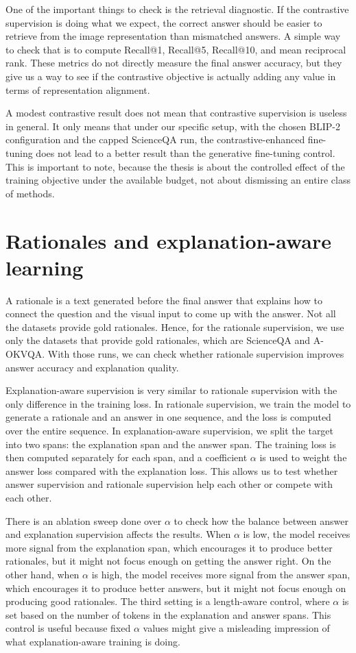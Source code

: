 \documentclass[12pt,bibliography=totoc,listof=totoc,BCOR=5mm,DIV=12,oneside,open=any]{scrbook}
\begin{document}
One of the important things to check is the retrieval diagnostic.
If the contrastive supervision is doing what we expect, the correct answer should be easier to retrieve from the image representation than mismatched answers.
A simple way to check that is to compute Recall@1, Recall@5, Recall@10, and mean reciprocal rank.
These metrics do not directly measure the final answer accuracy, but they give us a way to see if the contrastive objective is actually adding any value in terms of representation alignment.

A modest contrastive result does not mean that contrastive supervision is useless in general.
It only means that under our specific setup, with the chosen BLIP-2 configuration and the capped ScienceQA run, the contrastive-enhanced fine-tuning
does not lead to a better result than the generative fine-tuning control.
This is important to note, because the thesis is about the controlled effect of the training objective under the available budget, not about dismissing an entire class of methods.


\section{Rationales and explanation-aware learning}
A rationale is a text generated before the final answer that explains how to connect the question and the visual input to come up with the answer.
Not all the datasets provide gold rationales.
Hence, for the rationale supervision, we use only the datasets that provide gold rationales, which are ScienceQA and A-OKVQA.
With those runs, we can check whether rationale supervision improves answer accuracy and explanation quality.

Explanation-aware supervision is very similar to rationale supervision with the only difference in the training loss.
In rationale supervision, we train the model to generate a rationale and an answer in one sequence, and the loss is computed over the entire sequence.
In explanation-aware supervision, we split the target into two spans: the explanation span and the answer span.
The training loss is then computed separately for each span, and a coefficient $\alpha$ is used to weight the answer loss compared with the explanation loss.
This allows us to test whether answer supervision and rationale supervision help each other or compete with each other.

There is an ablation sweep done over $\alpha$ to check how the balance between answer and explanation supervision affects the results.
When $\alpha$ is low, the model receives more signal from the explanation span,
which encourages it to produce better rationales, but it might not focus enough on getting the answer right.
On the other hand, when $\alpha$ is high, the model receives more signal from the answer span,
which encourages it to produce better answers, but it might not focus enough on producing good rationales.
The third setting is a length-aware control,
where $\alpha$ is set based on the number of tokens in the explanation and answer spans.
This control is useful because fixed $\alpha$ values might give a misleading impression of what explanation-aware training is doing.
\end{document}
